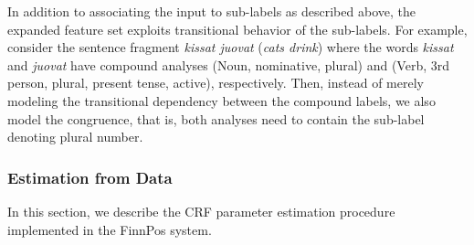 \documentclass[smallextended]{svjour3}       %
\DeclareMathOperator*{\argmin}{arg\,min}
\begin{document}
In addition to associating the input to sub-labels as described above, the expanded feature set exploits transitional behavior of the sub-labels. For example, consider the sentence fragment \emph{kissat juovat} (\emph{cats drink}) where the words \emph{kissat} and \emph{juovat} have compound analyses (Noun, nominative, plural) and (Verb, 3rd person, plural, present tense, active), respectively. Then, instead of merely modeling the transitional dependency between the compound labels, we also model the congruence, that is, both analyses need to contain the sub-label denoting plural number. 



\subsubsection{Estimation from Data}
\label{sec: estimation}

In this section, we describe the CRF parameter estimation procedure implemented in the FinnPos system.


%
%
\end{document}
